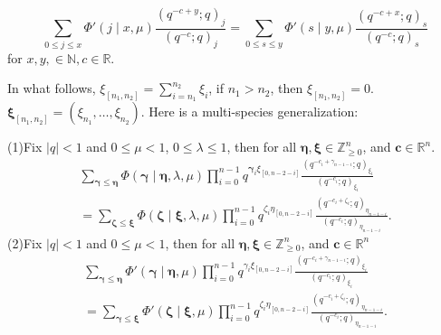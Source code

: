 \documentclass{ximera}
\begin{document}
 \begin{corollary}\label{Cor:1}
\begin{equation}  \sum_{0\le j\le x}\Phi'(j\mid x,\mu)\frac{(q^{-c+y};q)_j}{(q^{-c};q)_j}=\sum_{0\le s\le y}\Phi'(s\mid y,\mu)\frac{(q^{-c+x};q)_s}{(q^{-c};q)_s}
     \end{equation}
for $x,y,\in \mathbb{N},c\in \mathbb{R} $.%
\end{corollary}
\noindent
In what follows, $\xi_{[n_1,n_2]}=\sum_{i=n_1}^{n_2}\xi_i$, if $n_1>n_2$, then $\xi_{[n_1,n_2]}=0$. \newline $\boldsymbol\xi_{[n_1,n_2]}=(\xi_{n_1},\ldots,\xi_{n_2})$. Here is a multi-species generalization:

\begin{prop}\label{prop:1}
(1)Fix $\mid q\mid<1$ and $0\le \mu<1$, $0\le \lambda\le 1$, then for all $\boldsymbol\eta,\boldsymbol\xi\in\mathbb{Z}^{n}_{\ge 0}$, and $\boldsymbol{c}\in\mathbb{R}^{n}$.
\begin{multline}\label{eq:6}
\sum_{\boldsymbol\gamma\le \boldsymbol\eta }\Phi(\boldsymbol\gamma\mid\boldsymbol\eta,\lambda,\mu) \prod_{i=0}^{n-1}q^{\boldsymbol\gamma_i\xi_{[0,n-2-i]}}\frac{\left(q^{-c_i+\gamma_{n-1-i}};q\right)_{\xi_i}}{\left(q^{-c_i};q\right)_{\xi_i}}
    \\ =\sum_{\boldsymbol\zeta\le \boldsymbol\xi }\Phi(\boldsymbol\zeta\mid\boldsymbol\xi,\lambda,\mu)\prod_{i=0}^{n-1}q^{\zeta_i\eta_{[0,n-2-i]}}\frac{\left(q^{-c_i+\zeta_i};q\right)_{\eta_{n-1-i}}}{\left(q^{-c_i};q\right)_{\eta_{n-1-i}}}  .
\end{multline}
(2)Fix $\mid q\mid<1$ and $0\le \mu<1$, then for all $\boldsymbol\eta,\boldsymbol\xi\in\mathbb{Z}^{n}_{\ge 0}$, and $\boldsymbol{c}\in\mathbb{R}^{n}$ %
\begin{multline*}
    \sum_{\boldsymbol\gamma\le \boldsymbol\eta }\Phi'(\boldsymbol\gamma\mid\boldsymbol\eta,\mu) \prod_{i=0}^{n-1}q^{\gamma_i\xi_{[0,n-2-i]}}\frac{\left(q^{-c_i+\gamma_{n-1-i}};q\right)_{\xi_i}}{\left(q^{-c_i};q\right)_{\xi_i}}
     \\=\sum_{\boldsymbol\gamma\le \boldsymbol\xi }\Phi'(\boldsymbol\zeta\mid\boldsymbol\xi,\mu)\prod_{i=0}^{n-1}q^{\zeta_i\eta_{[0,n-2-i]}}\frac{\left(q^{-c_i+\zeta_i};q\right)_{\eta_{n-1-i}}}{\left(q^{-c_i};q\right)_{\eta_{n-1-i}}}  .
\end{multline*}
\end{prop}
\end{document}
